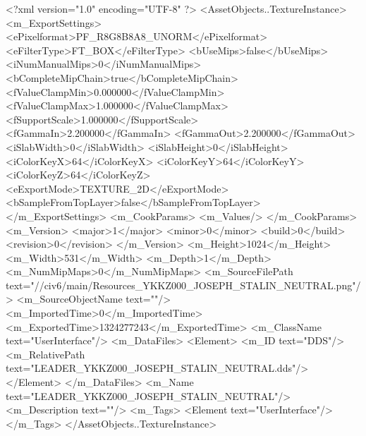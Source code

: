 <?xml version="1.0" encoding="UTF-8" ?>
<AssetObjects..TextureInstance>
	<m_ExportSettings>
		<ePixelformat>PF_R8G8B8A8_UNORM</ePixelformat>
		<eFilterType>FT_BOX</eFilterType>
		<bUseMips>false</bUseMips>
		<iNumManualMips>0</iNumManualMips>
		<bCompleteMipChain>true</bCompleteMipChain>
		<fValueClampMin>0.000000</fValueClampMin>
		<fValueClampMax>1.000000</fValueClampMax>
		<fSupportScale>1.000000</fSupportScale>
		<fGammaIn>2.200000</fGammaIn>
		<fGammaOut>2.200000</fGammaOut>
		<iSlabWidth>0</iSlabWidth>
		<iSlabHeight>0</iSlabHeight>
		<iColorKeyX>64</iColorKeyX>
		<iColorKeyY>64</iColorKeyY>
		<iColorKeyZ>64</iColorKeyZ>
		<eExportMode>TEXTURE_2D</eExportMode>
		<bSampleFromTopLayer>false</bSampleFromTopLayer>
	</m_ExportSettings>
	<m_CookParams>
		<m_Values/>
	</m_CookParams>
	<m_Version>
		<major>1</major>
		<minor>0</minor>
		<build>0</build>
		<revision>0</revision>
	</m_Version>
	<m_Height>1024</m_Height>
	<m_Width>531</m_Width>
	<m_Depth>1</m_Depth>
	<m_NumMipMaps>0</m_NumMipMaps>
	<m_SourceFilePath text="//civ6/main/Resources\LEADER_YKKZ000_JOSEPH_STALIN_NEUTRAL.png"/>
	<m_SourceObjectName text=""/>
	<m_ImportedTime>0</m_ImportedTime>
	<m_ExportedTime>1324277243</m_ExportedTime>
	<m_ClassName text="UserInterface"/>
	<m_DataFiles>
		<Element>
			<m_ID text="DDS"/>
			<m_RelativePath text="LEADER_YKKZ000_JOSEPH_STALIN_NEUTRAL.dds"/>
		</Element>
	</m_DataFiles>
	<m_Name text="LEADER_YKKZ000_JOSEPH_STALIN_NEUTRAL"/>
	<m_Description text=""/>
	<m_Tags>
		<Element text="UserInterface"/>
	</m_Tags>
</AssetObjects..TextureInstance>

